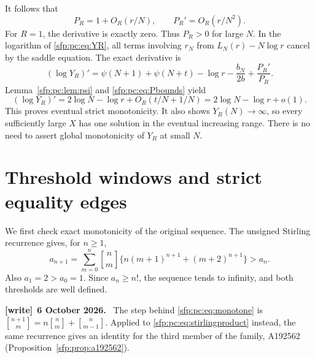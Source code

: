 \documentclass[11pt,letterpaper]{article}
\numberwithin{equation}{section}
\theoremstyle{definition}\newtheorem{definition}[theorem]{Definition}
\theoremstyle{remark}\newtheorem{remark}[theorem]{Remark}
\newcommand{\sone}[2]{\genfrac{[}{]}{0pt}{}{#1}{#2}}
\newenvironment{writenote}[1][]{\par\smallskip\begingroup\small
 \noindent\textbf{[write]}\if\relax\detokenize{#1}\relax\else~\textbf{#1.}\fi\ }%
 {\par\endgroup\smallskip}
\begin{document}
It follows that
\begin{equation}\label{sfp:pc:eq:Pbounds}
 P_R=1+O_R(r/N),\qquad
 P_R'=O_R(r/N^2).
\end{equation}
For $R=1$, the derivative is exactly zero. Thus $P_R>0$ for
large $N$. In the logarithm of \eqref{sfp:pc:eq:YR}, all terms involving
$r_N$ from $L_N(r)-N\log r$ cancel by the saddle equation.
The exact derivative is
\begin{equation}\label{sfp:pc:eq:envelope}
 (\log Y_R)'=
 \psi(N+1)+\psi(N+t)-\log r
 -\frac{b_N}{2b}+\frac{P_R'}{P_R}.
\end{equation}
Lemma~\ref{sfp:pc:lem:psi} and \eqref{sfp:pc:eq:Pbounds} yield
\begin{equation}\label{sfp:pc:eq:logYderivative}
 (\log Y_R)'=2\log N-\log r
             +O_R(t/N+1/N)
           =2\log N-\log r+o(1).
\end{equation}
This proves eventual strict monotonicity. It also shows
$Y_R(N)\to\infty$, so every sufficiently large $X$ has one
solution in the eventual increasing range. There is no need to
assert global monotonicity of $Y_R$ at small $N$.

\section{Threshold windows and strict equality edges}\label{sfp:pc:sec:thresholds}

We first check exact monotonicity of the original sequence.
The unsigned Stirling recurrence gives, for $n\geq1$,
\begin{equation}\label{sfp:pc:eq:monotone}
 a_{n+1}=\sum_{m=0}^n\sone nm
       \{n(m+1)^{n+1}+(m+2)^{n+1}\}>a_n.
\end{equation}
Also $a_1=2>a_0=1$. Since $a_n\geq n!$, the sequence tends to
infinity, and both thresholds are well defined.
\begin{writenote}[6 October 2026]
The step behind \eqref{sfp:pc:eq:monotone} is $\sone{n+1}m=n\sone nm+\sone n{m-1}$. Applied to \eqref{sfp:pc:eq:stirlingproduct} instead, the same recurrence gives an identity for the third member of the family, A192562 (Proposition~\ref{sfp:prop:a192562}).
\end{writenote}
\end{document}
